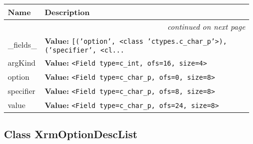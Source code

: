     \vspace{-1cm}
\hspace{\varindent}\begin{longtable}{|p{\varnamewidth}|p{\vardescrwidth}|l}
\cline{1-2}
\cline{1-2} \centering \textbf{Name} & \centering \textbf{Description}& \\
\cline{1-2}
\endhead\cline{1-2}\multicolumn{3}{r}{\small\textit{continued on next page}}\\\endfoot\cline{1-2}
\endlastfoot\raggedright \_\-f\-i\-e\-l\-d\-s\-\_\- & \raggedright \textbf{Value:} 
{\tt \texttt{[}\texttt{(}\texttt{'}\texttt{option}\texttt{'}\texttt{, }{\textless}class 'ctypes.c\_char\_p'{\textgreater}\texttt{)}\texttt{, }\texttt{(}\texttt{'}\texttt{specifier}\texttt{'}\texttt{, }{\textless}cl\texttt{...}}&\\
\cline{1-2}
\raggedright a\-r\-g\-K\-i\-n\-d\- & \raggedright \textbf{Value:} 
{\tt {\textless}Field type=c\_int, ofs=16, size=4{\textgreater}}&\\
\cline{1-2}
\raggedright o\-p\-t\-i\-o\-n\- & \raggedright \textbf{Value:} 
{\tt {\textless}Field type=c\_char\_p, ofs=0, size=8{\textgreater}}&\\
\cline{1-2}
\raggedright s\-p\-e\-c\-i\-f\-i\-e\-r\- & \raggedright \textbf{Value:} 
{\tt {\textless}Field type=c\_char\_p, ofs=8, size=8{\textgreater}}&\\
\cline{1-2}
\raggedright v\-a\-l\-u\-e\- & \raggedright \textbf{Value:} 
{\tt {\textless}Field type=c\_char\_p, ofs=24, size=8{\textgreater}}&\\
\cline{1-2}
\end{longtable}



\subsection{Class XrmOptionDescList}

